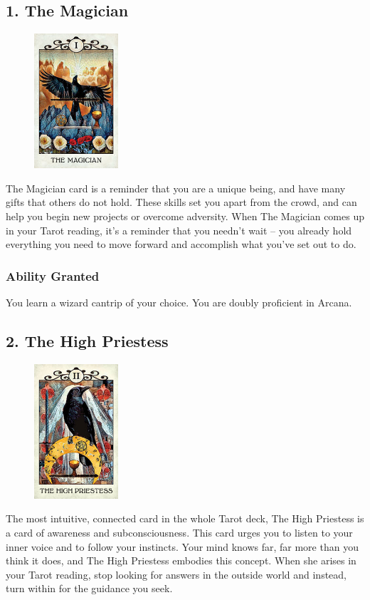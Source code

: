 \documentclass[10pt,twoside,twocolumn,openany,nodeprecatedcode]{dndbook}
\begin{document}
    \subsection*{1. The Magician}

    \begin{figure}
        \includegraphics[height=5cm,width=\linewidth]{magician.jpg}
    \end{figure}
    The Magician card is a reminder that you are a unique being, and have many gifts that others do not hold. These skills set you apart from the crowd, and can help you begin new projects or overcome adversity. When The Magician comes up in your Tarot reading, it's a reminder that you needn't wait -- you already hold everything you need to move forward and accomplish what you've set out to do.

    \subsubsection*{Ability Granted}
    You learn a wizard cantrip of your choice. You are doubly proficient in Arcana.

    \subsection*{2. The High Priestess}

    \begin{figure}
        \includegraphics[height=5cm,width=\linewidth]{highpriestess.jpg}
    \end{figure}
    The most intuitive, connected card in the whole Tarot deck, The High Priestess is a card of awareness and subconsciousness. This card urges you to listen to your inner voice and to follow your instincts. Your mind knows far, far more than you think it does, and The High Priestess embodies this concept. When she arises in your Tarot reading, stop looking for answers in the outside world and instead, turn within for the guidance you seek.
\end{document}
